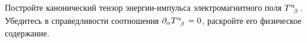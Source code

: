 \documentclass[__main__.tex]{subfiles}
\begin{document}
Постройте канонический тензор энергии-импульса электромагнитного поля $T\indices{^\alpha_\beta}$. Убедитесь в справедливости соотношения $\partial_\alpha T\indices{^\alpha_\beta}=0$, раскройте его физическое содержание.\\ 

\end{document}
